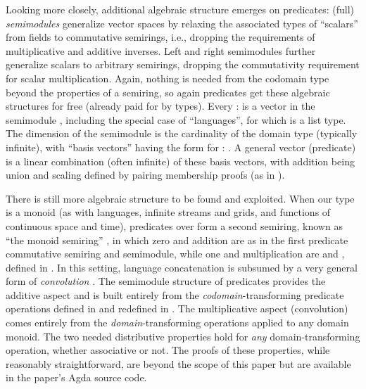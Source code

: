 \documentclass[acmsmall,screen,timestamp]{acmart}  %
\begin{document}
Looking more closely, additional algebraic structure emerges on predicates: (full) \emph{semimodules} generalize vector spaces by relaxing the associated types of ``scalars'' from fields to commutative semirings, i.e., dropping the requirements of multiplicative and additive inverses.
Left and right semimodules further generalize scalars to arbitrary semirings, dropping the commutativity requirement for scalar multiplication.
Again, nothing is needed from the codomain type  beyond the properties of a semiring, so again predicates get these algebraic structures for free (already paid for by types).
Every { \AS :  } is a vector in the semimodule { }, including the special case of ``languages'', for which  is a list type.
The dimension of the semimodule is the cardinality of the domain type  (typically infinite), with ``basis vectors'' having the form { } for { \AS : }.
A general vector (predicate) is a linear combination (often infinite) of these basis vectors, with addition being union and scaling defined by pairing membership proofs (as in ).

There is still more algebraic structure to be found and exploited.
When our  type  is a monoid (as with languages, infinite streams and grids, and functions of continuous space and time), predicates over  form a second semiring, known as ``the monoid semiring'' \citep{Golan2005RecentSemi}, in which zero and addition are as in the first predicate commutative semiring and semimodule, while one and multiplication are  and , defined in .
In this setting, language concatenation is subsumed by a very general form of \emph{convolution} \cite{Golan2005RecentSemi, Dongol2016CUC, Elliott2019-convolution}.
The semimodule structure of predicates provides the additive aspect and is built entirely from the \emph{codomain}-transforming predicate operations defined in  and redefined in .
The multiplicative aspect (convolution) comes entirely from the \emph{domain}-transforming operations applied to any domain monoid.
The two needed distributive properties hold for \emph{any} domain-transforming operation, whether associative or not.
The proofs of these properties, while reasonably straightforward, are beyond the scope of this paper but are available in the paper's Agda source code.
\end{document}
